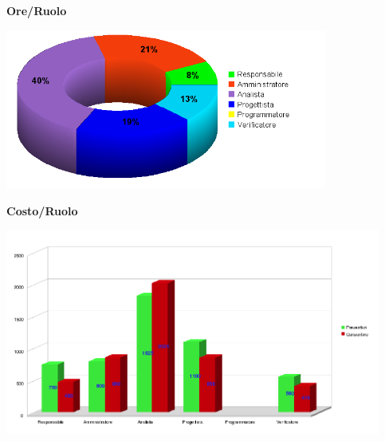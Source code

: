 \begin{center}\textbf{Ore/Ruolo}
\end{center}
\includegraphics[width=300pt]{Cons_RR-RPP2}

\begin{center}\textbf{Costo/Ruolo}
\end{center}
\includegraphics[width=350pt]{Cons_RR-RPP1}


